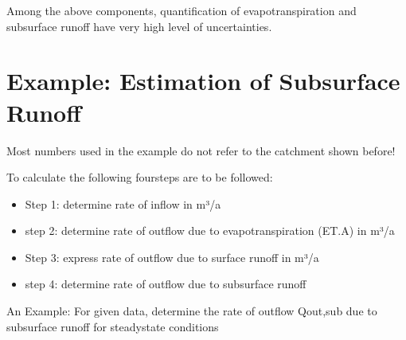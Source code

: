 \documentclass[letterpaper,10pt,english]{jupyterBook}
\let\sphinxpxdimen\pdfpxdimen\else\newdimen\sphinxpxdimen
\begin{document}
\sphinxAtStartPar
Among the above components, quantification of evapotranspiration and subsurface runoff have very high level of uncertainties.

\noindent{\hspace*{\fill}\sphinxincludegraphics[height=500\sphinxpxdimen]{{L01_f_9}.png}\hspace*{\fill}}


\section{Example: Estimation of Subsurface Runoff}
\label{\detokenize{content/background/03_basic_hydrogeology:example-estimation-of-subsurface-runoff}}
\sphinxAtStartPar
Most numbers used in the example do not refer to the catchment shown before!

\sphinxAtStartPar
To calculate the following four\sphinxhyphen{}steps are to be followed:
\begin{itemize}
\item {} 
\sphinxAtStartPar
Step 1: determine rate of inflow in m³/a

\item {} 
\sphinxAtStartPar
step 2: determine rate of outflow due to evapotranspiration (ET.A) in m³/a

\item {} 
\sphinxAtStartPar
Step 3: express rate of outflow due to surface runoff in m³/a

\item {} 
\sphinxAtStartPar
step 4: determine rate of outflow due to subsurface runoff

\end{itemize}

\sphinxAtStartPar
An Example:
For given data, determine the rate of outflow Qout,sub due to subsurface runoff for steady\sphinxhyphen{}state conditions
\end{document}
